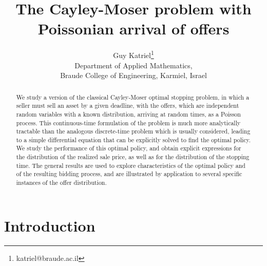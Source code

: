 \documentclass{article}
\title{The Cayley-Moser problem with Poissonian arrival of offers}
\author{Guy Katriel\thanks{katriel@braude.ac.il}\\
	Department of Applied Mathematics,\\
	Braude College of Engineering, Karmiel, Israel}
\date{}
\numberwithin{equation}{section}
\begin{document}

\maketitle 

\begin{abstract}
We study a version of the classical Cayley-Moser optimal stopping problem, in which
a seller must sell an asset by a given deadline, with the
offers, which are independent random variables with a known distribution, arriving at random times, as a Poisson process.
This continuous-time 
formulation of the problem is much more
analytically tractable than the 
analogous discrete-time problem which 
is usually considered, leading to a simple differential equation that can be explicitly solved  to find the optimal policy.
We study the performance
of this optimal policy, and obtain explicit expressions for the distribution of the realized sale price, as well as for the distribution of the
stopping time. The general results 
are used to explore characteristics of the optimal policy and of the resulting bidding process, and are illustrated by application to 
several specific instances of the offer distribution.
\end{abstract}


	

\section{Introduction}
\end{document}
